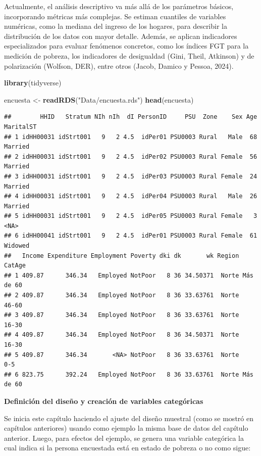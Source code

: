 \documentclass[
  12pt,
]{book}
\newenvironment{Shaded}{\begin{snugshade}}{\end{snugshade}}
\newcommand{\FunctionTok}[1]{\textcolor[rgb]{0.13,0.29,0.53}{\textbf{#1}}}
\newcommand{\NormalTok}[1]{#1}
\newcommand{\OtherTok}[1]{\textcolor[rgb]{0.56,0.35,0.01}{#1}}
\newcommand{\StringTok}[1]{\textcolor[rgb]{0.31,0.60,0.02}{#1}}
\begin{document}
Actualmente, el análisis descriptivo va más allá de los parámetros básicos, incorporando métricas más complejas. Se estiman cuantiles de variables numéricas, como la mediana del ingreso de los hogares, para describir la distribución de los datos con mayor detalle. Además, se aplican indicadores especializados para evaluar fenómenos concretos, como los índices FGT para la medición de pobreza, los indicadores de desigualdad (Gini, Theil, Atkinson) y de polarización (Wolfson, DER), entre otros (Jacob, Damico y Pessoa, 2024).

\begin{Shaded}
\begin{Highlighting}[]
\FunctionTok{library}\NormalTok{(tidyverse)}

\NormalTok{encuesta }\OtherTok{\textless{}{-}} \FunctionTok{readRDS}\NormalTok{(}\StringTok{"Data/encuesta.rds"}\NormalTok{)}
\FunctionTok{head}\NormalTok{(encuesta)}
\end{Highlighting}
\end{Shaded}

\begin{verbatim}
##        HHID   Stratum NIh nIh  dI PersonID     PSU  Zone    Sex Age MaritalST
## 1 idHH00031 idStrt001   9   2 4.5  idPer01 PSU0003 Rural   Male  68   Married
## 2 idHH00031 idStrt001   9   2 4.5  idPer02 PSU0003 Rural Female  56   Married
## 3 idHH00031 idStrt001   9   2 4.5  idPer03 PSU0003 Rural Female  24   Married
## 4 idHH00031 idStrt001   9   2 4.5  idPer04 PSU0003 Rural   Male  26   Married
## 5 idHH00031 idStrt001   9   2 4.5  idPer05 PSU0003 Rural Female   3      <NA>
## 6 idHH00041 idStrt001   9   2 4.5  idPer01 PSU0003 Rural Female  61   Widowed
##   Income Expenditure Employment Poverty dki dk       wk Region    CatAge
## 1 409.87      346.34   Employed NotPoor   8 36 34.50371  Norte Más de 60
## 2 409.87      346.34   Employed NotPoor   8 36 33.63761  Norte     46-60
## 3 409.87      346.34   Employed NotPoor   8 36 33.63761  Norte     16-30
## 4 409.87      346.34   Employed NotPoor   8 36 34.50371  Norte     16-30
## 5 409.87      346.34       <NA> NotPoor   8 36 33.63761  Norte       0-5
## 6 823.75      392.24   Employed NotPoor   8 36 33.63761  Norte Más de 60
\end{verbatim}

\textbf{Definición del diseño y creación de variables categóricas}

Se inicia este capítulo haciendo el ajuste del diseño muestral (como se mostró en capítulos anteriores) usando como ejemplo la misma base de datos del capítulo anterior. Luego, para efectos del ejemplo, se genera una variable categórica la cual indica si la persona encuestada está en estado de pobreza o no como sigue:
\end{document}
